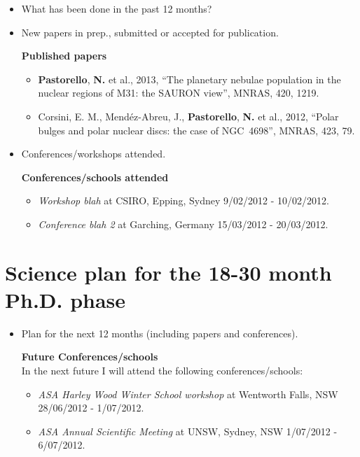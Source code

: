 \documentclass[useAMS,usenatbib,onecolumn]{mnras}
\begin{document}
\begin{itemize}
  \item{What has been done in the past 12 months?}
  \item{New papers in prep., submitted or accepted for publication.\\}

  \textbf{Published papers}
  \begin{itemize}
      \item{\textbf{Pastorello}, \textbf{N.} et al., 2013}, ``The planetary nebulae population in the nuclear regions of M31: the SAURON view'', MNRAS, 420, 1219.
      \item{Corsini, E. M., Mend\'ez-Abreu, J., \textbf{Pastorello}, \textbf{N.} et al., 2012}, ``Polar bulges and polar nuclear discs: the case of NGC~4698'', MNRAS, 423, 79.
  \end{itemize}

  \item{Conferences/workshops attended.\\}

  \textbf{Conferences/schools attended}
  \begin{itemize}
      \item{\textit{Workshop blah}} at CSIRO, Epping, Sydney 9/02/2012 - 10/02/2012.
      \item{\textit{Conference blah 2}} at Garching, Germany 15/03/2012 - 20/03/2012.
  \end{itemize}

\end{itemize}


\section{Science plan for the 18-30 month Ph.D. phase}
\label{sec:sciencePlan}

\begin{itemize}
  \item{Plan for the next 12 months (including papers and conferences). \\}

  \textbf{Future Conferences/schools\\}
  In the next future I will attend the following conferences/schools:
  \begin{itemize}
    \item{\textit{ASA Harley Wood Winter School workshop}} at Wentworth Falls, NSW 28/06/2012 - 1/07/2012.
    \item{\textit{ASA Annual Scientific Meeting}} at UNSW, Sydney, NSW 1/07/2012 - 6/07/2012.
  \end{itemize}

\end{itemize}
\end{document}
